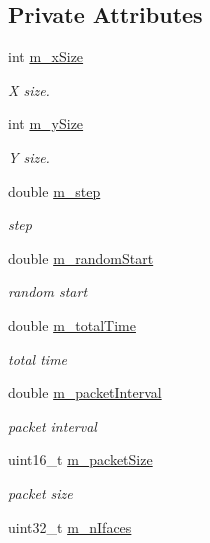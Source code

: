 \subsection*{Private Attributes}
\begin{DoxyCompactItemize}
\item 
int \hyperlink{classMeshTest_a46eca8d80e694b675c8a9b8dd737eb2f}{m\+\_\+x\+Size}
\begin{DoxyCompactList}\small\item\em X size. \end{DoxyCompactList}\item 
int \hyperlink{classMeshTest_a291ba9fda6f607983de4e69a65d6b3a5}{m\+\_\+y\+Size}
\begin{DoxyCompactList}\small\item\em Y size. \end{DoxyCompactList}\item 
double \hyperlink{classMeshTest_a0d2d3a9fcecb4d05082e00e86f582131}{m\+\_\+step}
\begin{DoxyCompactList}\small\item\em step \end{DoxyCompactList}\item 
double \hyperlink{classMeshTest_ac6a22cda2e9c16143fcbbab4e40f5d4e}{m\+\_\+random\+Start}
\begin{DoxyCompactList}\small\item\em random start \end{DoxyCompactList}\item 
double \hyperlink{classMeshTest_af34b52e88b6f15ad05dc07788e53e35b}{m\+\_\+total\+Time}
\begin{DoxyCompactList}\small\item\em total time \end{DoxyCompactList}\item 
double \hyperlink{classMeshTest_aaa572b5f2eb6a2355a002616cdf4990e}{m\+\_\+packet\+Interval}
\begin{DoxyCompactList}\small\item\em packet interval \end{DoxyCompactList}\item 
uint16\+\_\+t \hyperlink{classMeshTest_a6a25f074e877610164e37f0c1f566dee}{m\+\_\+packet\+Size}
\begin{DoxyCompactList}\small\item\em packet size \end{DoxyCompactList}\item 
uint32\+\_\+t \hyperlink{classMeshTest_a3dee1b5f3e465791fcd96e215601b1e9}{m\+\_\+n\+Ifaces}

\end{DoxyCompactItemize}
